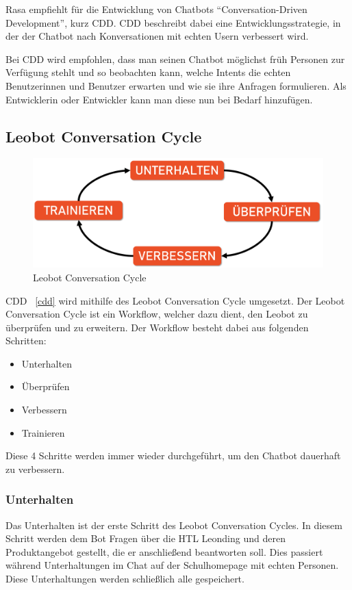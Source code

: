 Rasa empfiehlt für die Entwicklung von Chatbots ``Conversation-Driven Development'', kurz CDD.\cite{cdd}
CDD beschreibt dabei eine Entwicklungsstrategie, in der der Chatbot nach Konversationen mit echten Usern verbessert wird.

Bei CDD wird empfohlen, dass man seinen Chatbot möglichst früh Personen zur Verfügung stehlt und so beobachten kann, welche Intents die echten Benutzerinnen und Benutzer erwarten und wie sie ihre Anfragen formulieren.
Als Entwicklerin oder Entwickler kann man diese nun bei Bedarf hinzufügen.


\subsection{Leobot Conversation Cycle}\label{subsec:leobot-conversation-cycle}

\begin{figure}[hbt!]
    \centering
    \includegraphics[scale=0.2]{pics/LeoCircle}
    \caption{Leobot Conversation Cycle}
    \label{fig:impl:ConversationCycle}
\end{figure}

CDD ~\ref{cdd} wird mithilfe des Leobot Conversation Cycle umgesetzt.
Der Leobot Conversation Cycle ist ein Workflow, welcher dazu dient, den Leobot zu überprüfen und zu erweitern.
Der Workflow besteht dabei aus folgenden Schritten:

\begin{itemize}
    \item Unterhalten
    \item Überprüfen
    \item Verbessern
    \item Trainieren
\end{itemize}

Diese 4 Schritte werden immer wieder durchgeführt, um den Chatbot dauerhaft zu verbessern.

\subsubsection{Unterhalten}
Das Unterhalten ist der erste Schritt des Leobot Conversation Cycles.
In diesem Schritt werden dem Bot Fragen über die HTL Leonding und deren Produktangebot gestellt, die er anschließend beantworten soll.
Dies passiert während Unterhaltungen im Chat auf der Schulhomepage mit echten Personen.
Diese Unterhaltungen werden schließlich alle gespeichert.

